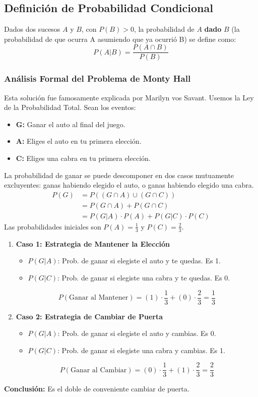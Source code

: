 \documentclass[12pt, letterpaper]{article}
\begin{document}
\subsection{Definición de Probabilidad Condicional}
Dados dos sucesos $A$ y $B$, con $P(B)>0$, la probabilidad de $A$ \textbf{dado} $B$ (la probabilidad de que ocurra A asumiendo que ya ocurrió B) se define como:
\[ P(A|B) = \frac{P(A \cap B)}{P(B)} \]

\subsubsection{Análisis Formal del Problema de Monty Hall}
Esta solución fue famosamente explicada por Marilyn vos Savant. Usemos la Ley de la Probabilidad Total.
Sean los eventos:
\begin{itemize}
	\item \textbf{G:} Ganar el auto al final del juego.
	\item \textbf{A:} Eliges el auto en tu primera elección.
	\item \textbf{C:} Eliges una cabra en tu primera elección.
\end{itemize}
La probabilidad de ganar se puede descomponer en dos casos mutuamente excluyentes: ganas habiendo elegido el auto, o ganas habiendo elegido una cabra.
\begin{align*}
	P(G) & = P((G \cap A) \cup (G \cap C))         \\
	     & = P(G \cap A) + P(G \cap C)             \\
	     & = P(G|A) \cdot P(A) + P(G|C) \cdot P(C)
\end{align*}
Las probabilidades iniciales son $P(A)=\frac{1}{3}$ y $P(C)=\frac{2}{3}$.
\begin{enumerate}
	\item \textbf{Caso 1: Estrategia de Mantener la Elección}
	      \begin{itemize}
		      \item $P(G|A)$: Prob. de ganar si elegiste el auto y te quedas. Es 1.
		      \item $P(G|C)$: Prob. de ganar si elegiste una cabra y te quedas. Es 0.
	      \end{itemize}
	      \[ P(\text{Ganar al Mantener}) = (1) \cdot \frac{1}{3} + (0) \cdot \frac{2}{3} = \frac{1}{3} \]

	\item \textbf{Caso 2: Estrategia de Cambiar de Puerta}
	      \begin{itemize}
		      \item $P(G|A)$: Prob. de ganar si elegiste el auto y cambias. Es 0.
		      \item $P(G|C)$: Prob. de ganar si elegiste una cabra y cambias. Es 1.
	      \end{itemize}
	      \[ P(\text{Ganar al Cambiar}) = (0) \cdot \frac{1}{3} + (1) \cdot \frac{2}{3} = \frac{2}{3} \]
\end{enumerate}
\textbf{Conclusión:} Es el doble de conveniente cambiar de puerta.
\end{document}
